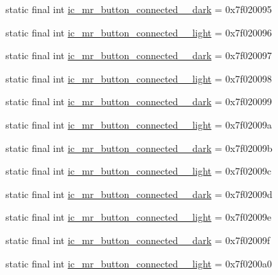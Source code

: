 \begin{CompactItemize}
\item 
static final int \hyperlink{classandroid_1_1support_1_1v7_1_1cardview_1_1_r_1_1drawable_955da4ee104d46efdf0b1172c9968186}{ic\_\-mr\_\-button\_\-connected\_\_\-dark} = 0x7f020095
\item 
static final int \hyperlink{classandroid_1_1support_1_1v7_1_1cardview_1_1_r_1_1drawable_6ecbbd1b6e7918bd300901ddcf463d21}{ic\_\-mr\_\-button\_\-connected\_\_\-light} = 0x7f020096
\item 
static final int \hyperlink{classandroid_1_1support_1_1v7_1_1cardview_1_1_r_1_1drawable_c86f6c789941f7441f187ff06deb976c}{ic\_\-mr\_\-button\_\-connected\_\_\-dark} = 0x7f020097
\item 
static final int \hyperlink{classandroid_1_1support_1_1v7_1_1cardview_1_1_r_1_1drawable_135db7f0c379b5778f2bfc1eb7eedc97}{ic\_\-mr\_\-button\_\-connected\_\_\-light} = 0x7f020098
\item 
static final int \hyperlink{classandroid_1_1support_1_1v7_1_1cardview_1_1_r_1_1drawable_b322ebfe41ec2c3c1da243112a28ec10}{ic\_\-mr\_\-button\_\-connected\_\_\-dark} = 0x7f020099
\item 
static final int \hyperlink{classandroid_1_1support_1_1v7_1_1cardview_1_1_r_1_1drawable_7b0dcd0f5a94404789b5611518311be3}{ic\_\-mr\_\-button\_\-connected\_\_\-light} = 0x7f02009a
\item 
static final int \hyperlink{classandroid_1_1support_1_1v7_1_1cardview_1_1_r_1_1drawable_d1a806951a5296c45c0d36de0ce6803d}{ic\_\-mr\_\-button\_\-connected\_\_\-dark} = 0x7f02009b
\item 
static final int \hyperlink{classandroid_1_1support_1_1v7_1_1cardview_1_1_r_1_1drawable_08e172ac41e6ed00e0a89665f440e888}{ic\_\-mr\_\-button\_\-connected\_\_\-light} = 0x7f02009c
\item 
static final int \hyperlink{classandroid_1_1support_1_1v7_1_1cardview_1_1_r_1_1drawable_f7794e7cb3d316b42aeedaeb9607a159}{ic\_\-mr\_\-button\_\-connected\_\_\-dark} = 0x7f02009d
\item 
static final int \hyperlink{classandroid_1_1support_1_1v7_1_1cardview_1_1_r_1_1drawable_01c3d52ecb4319cde2af22ee915c9745}{ic\_\-mr\_\-button\_\-connected\_\_\-light} = 0x7f02009e
\item 
static final int \hyperlink{classandroid_1_1support_1_1v7_1_1cardview_1_1_r_1_1drawable_8b43f6a7ee00a4bb652d6b451ecb0130}{ic\_\-mr\_\-button\_\-connected\_\_\-dark} = 0x7f02009f
\item 
static final int \hyperlink{classandroid_1_1support_1_1v7_1_1cardview_1_1_r_1_1drawable_0e78dbc233775785f31d9c2ab0e62311}{ic\_\-mr\_\-button\_\-connected\_\_\-light} = 0x7f0200a0

\end{CompactItemize}
